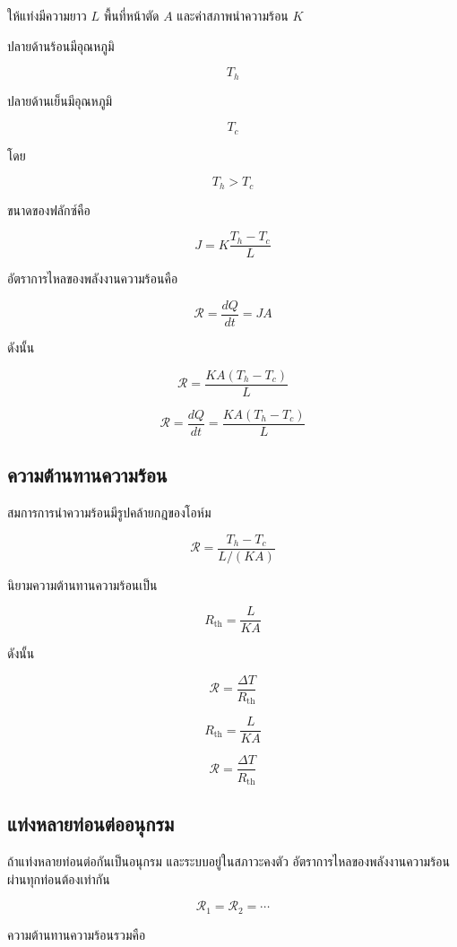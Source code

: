 ให้แท่งมีความยาว $L$ พื้นที่หน้าตัด $A$ และค่าสภาพนำความร้อน $K$

ปลายด้านร้อนมีอุณหภูมิ

\[
T_h
\]

ปลายด้านเย็นมีอุณหภูมิ

\[
T_c
\]

โดย

\[
T_h>T_c
\]

ขนาดของฟลักซ์คือ

\[
J=K\frac{T_h-T_c}{L}
\]

อัตราการไหลของพลังงานความร้อนคือ

\[
\mathcal{R}=\frac{dQ}{dt}=JA
\]

ดังนั้น

\[
\mathcal{R}
=
\frac{KA(T_h-T_c)}{L}
\]

\begin{tcolorbox}[title=อัตราการนำความร้อน]
\[
\boxed{
\mathcal{R}
=
\frac{dQ}{dt}
=
\frac{KA(T_h-T_c)}{L}
}
\]
\end{tcolorbox}

\subsection{ความต้านทานความร้อน}

สมการการนำความร้อนมีรูปคล้ายกฎของโอห์ม

\[
\mathcal{R}
=
\frac{T_h-T_c}{L/(KA)}
\]

นิยามความต้านทานความร้อนเป็น

\[
R_{\text{th}}=\frac{L}{KA}
\]

ดังนั้น

\[
\mathcal{R}=\frac{\Delta T}{R_{\text{th}}}
\]

\begin{tcolorbox}[title=ความต้านทานความร้อน]
\[
\boxed{R_{\text{th}}=\frac{L}{KA}}
\]

\[
\boxed{\mathcal{R}=\frac{\Delta T}{R_{\text{th}}}}
\]
\end{tcolorbox}

\subsection{แท่งหลายท่อนต่ออนุกรม}

ถ้าแท่งหลายท่อนต่อกันเป็นอนุกรม และระบบอยู่ในสภาวะคงตัว อัตราการไหลของพลังงานความร้อนผ่านทุกท่อนต้องเท่ากัน

\[
\mathcal{R}_1=\mathcal{R}_2=\cdots
\]

ความต้านทานความร้อนรวมคือ

